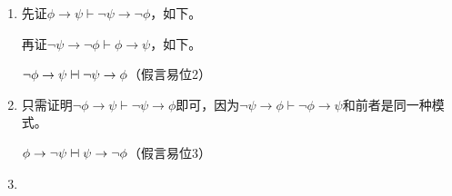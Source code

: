 \documentclass[punct=custom/kaiming,fontset=none]{ctexart}
\makeatletter
\newcommand*{\vdashv}{\mathrel{\ooalign{$\vdash$\cr\hskip1pt\reflectbox{$\vdash$}}}}
\renewenvironment{proof}[1][\proofname]{\par
  \pushQED{\qed}%
  \normalfont \topsep6\p@\@plus6\p@\relax
  \trivlist
  \item[\hskip\labelsep
    \bfseries
    #1%
    ]\ignorespaces
}{%
  \popQED\endtrivlist\@endpefalse
}
\theoremstyle{remark}
\let\proves\vdash
\makeatother
\begin{document}
\begin{description}
\begin{enumerate}
    \begin{proof}
      先证\(\phi \to \psi \proves \neg\psi \to \neg\phi\)，如下。
      \begin{ND}
        \label{1}
        \label{2}
        \label{3}
        \label{4}
      \end{ND}
      再证\(\neg\psi \to \neg\phi \proves \phi \to \psi\)，如下。
      \begin{ND}
        \label{1}
        \label{2}
      \end{ND}
    \end{proof}
    \(\neg\phi \to \psi \vdashv \neg\psi \to \phi\)\hfill（\hypertarget{ded:contrapose2}{假言易位2}）
    \begin{proof}
      只需证明\(\neg\phi \to \psi \proves \neg\psi \to \phi\)即可，因为\(\neg\psi \to \phi \proves \neg\phi \to \psi\)和前者是同一种模式。
      \begin{ND}
        \label{1}
        \label{2}
      \end{ND}
    \end{proof}
    \(\phi \to \neg\psi \vdashv \psi \to \neg\phi\)\hfill（\hypertarget{ded:contrapose3}{假言易位3}）
    \begin{proof}

\end{proof}
\end{enumerate}
\end{description}
\end{document}
